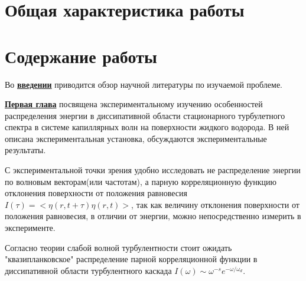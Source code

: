
\section*{Общая характеристика работы}

\newcommand{\actuality}{\underline{\textbf{\actualityTXT}}}
\newcommand{\progress}{\underline{\textbf{\progressTXT}}}
\newcommand{\aim}{\underline{{\textbf\aimTXT}}}
\newcommand{\tasks}{\underline{\textbf{\tasksTXT}}}
\newcommand{\novelty}{\underline{\textbf{\noveltyTXT}}}
\newcommand{\influence}{\underline{\textbf{\influenceTXT}}}
\newcommand{\methods}{\underline{\textbf{\methodsTXT}}}
\newcommand{\defpositions}{\underline{\textbf{\defpositionsTXT}}}
\newcommand{\reliability}{\underline{\textbf{\reliabilityTXT}}}
\newcommand{\probation}{\underline{\textbf{\probationTXT}}}
\newcommand{\contribution}{\underline{\textbf{\contributionTXT}}}
\newcommand{\publications}{\underline{\textbf{\publicationsTXT}}}

 

\section*{Содержание работы}
Во \underline{\textbf{введении}} приводится обзор научной литературы по изучаемой проблеме.

\underline{\textbf{Первая глава}} посвящена экспериментальному изучению особенностей распределения энергии в диссипативной области стационарного турбулетного спектра в системе капиллярных волн на поверхности жидкого водорода. В ней описана экспериментальная установка, обсуждаются экспериментальные результаты.

С экспериментальной точки зрения удобно исследовать не распределение энергии по волновым векторам(или частотам), а парную корреляционную функцию отклонения поверхности от положения равновесия $I(\tau)=<\eta(r, t+\tau)\eta(r,t)>$, так как величину отклонения поверхности от положения равновесия, в отличии от энергии, можно непосредственно измерить в эксперименте.

Согласно теории слабой волной турбулентности \cite{Ryzhenkova1990} стоит ожидать "квазипланковское"{} распределение парной корреляционной функции в диссипативной области турбулентного каскада $I(\omega) \sim \omega^{-s} e^{-\omega/\omega_d}$.

